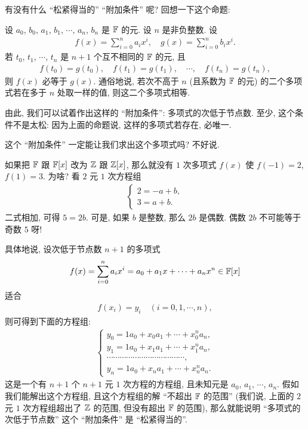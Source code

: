 有没有什么 ``松紧得当的'' ``附加条件'' 呢? 回想一下这个命题:

\begin{proposition}
    设 $a_0$, $b_0$, $a_1$, $b_1$, $\cdots$, $a_n$, $b_n$ 是 $\mathbb{F}$ 的元. 设 $n$ 是非负整数. 设
    \begin{align*}
        f(x) = \sum_{i = 0}^n a_i x^i, \quad g(x) = \sum_{i = 0}^n b_i x^i.
    \end{align*}
    若 $t_0$, $t_1$, $\cdots$, $t_n$ 是 $n+1$ 个互不相同的 $\mathbb{F}$ 的元, 且
    \begin{align*}
        f(t_0) = g(t_0), \quad f(t_1) = g(t_1), \quad \cdots, \quad f(t_n) = g(t_n),
    \end{align*}
    则 $f(x)$ 必等于 $g(x)$. 通俗地说, 若次不高于 $n$ (且系数为 $\mathbb{F}$ 的元) 的二个多项式若在多于 $n$ 处取一样的值, 则这二个多项式相等.
\end{proposition}

由此, 我们可以试着作出这样的 ``附加条件'': 多项式的次低于节点数. 至少, 这个条件不是太松: 因为上面的命题说, 这样的多项式若存在, 必唯一.

这个 ``附加条件'' 一定能让我们求出这个多项式吗? 不好说.

\begin{example}
    如果把 $\mathbb{F}$ 跟 $\mathbb{F}[x]$ 改为 $\mathbb{Z}$ 跟 $\mathbb{Z}[x]$, 那么就没有 $1$ 次多项式 $f(x)$ 使 $f(-1)=2$, $f(1)=3$. 为啥? 看 $2$ 元 $1$ 次方程组
    \begin{align*}
        \begin{cases}
            2 = -a + b, \\
            3 = a + b.
        \end{cases}
    \end{align*}
    二式相加, 可得 $5 = 2b$. 可是, 如果 $b$ 是整数, 那么 $2b$ 是偶数. 偶数 $2b$ 不可能等于奇数 $5$ 呀!
\end{example}

具体地说, 设次低于节点数 $n+1$ 的多项式
\begin{align*}
    f(x) = \sum_{i=0}^n a_i x^i = a_0 + a_1 x + \cdots + a_n x^n \in \mathbb{F}[x]
\end{align*}
适合
\begin{align*}
    f(x_i) = y_i \quad (i = 0,1,\cdots,n),
\end{align*}
则可得到下面的方程组:
\begin{align*}
    \begin{cases}
        y_0 = 1 a_0 + x_0 a_1 + \cdots + x_0^n a_n, \\
        y_1 = 1 a_0 + x_1 a_1 + \cdots + x_1^n a_n, \\
        \cdots \cdots \cdots \cdots \cdots \cdots \cdots \cdots
        \cdots \cdots \cdots \cdots,                \\
        y_n = 1 a_0 + x_n a_1 + \cdots + x_n^n a_n.
    \end{cases}
\end{align*}
这是一个有 $n+1$ 个 $n+1$ 元 $1$ 次方程的方程组, 且未知元是 $a_0$, $a_1$, $\cdots$, $a_n$. 假如我们能解出这个方程组, 且这个方程组的解 ``不超出 $\mathbb{F}$ 的范围'' (我们说, 上面的 $2$ 元 $1$ 次方程组超出了 $\mathbb{Z}$ 的范围, 但没有超出 $\mathbb{F}$ 的范围), 那么就能说明 ``多项式的次低于节点数'' 这个 ``附加条件'' 是 ``松紧得当的''.

